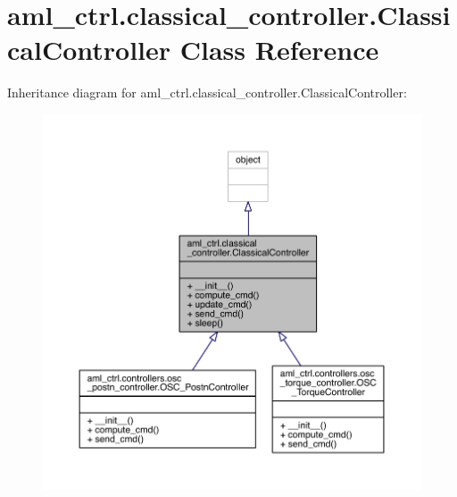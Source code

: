\hypertarget{classaml__ctrl_1_1classical__controller_1_1_classical_controller}{}\section{aml\+\_\+ctrl.\+classical\+\_\+controller.\+Classical\+Controller Class Reference}
\label{classaml__ctrl_1_1classical__controller_1_1_classical_controller}


Inheritance diagram for aml\+\_\+ctrl.\+classical\+\_\+controller.\+Classical\+Controller\+:
\nopagebreak
\begin{figure}[H]
\begin{center}
\leavevmode
\includegraphics[width=350pt]{classaml__ctrl_1_1classical__controller_1_1_classical_controller__inherit__graph}
\end{center}
\end{figure}


